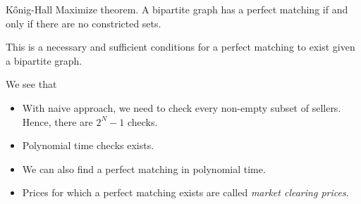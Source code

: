 \begin{theorem}
	Kőnig-Hall Maximize theorem. A bipartite graph has a perfect matching if and only if there are no constricted sets.
\end{theorem}
\begin{note}
	This is a necessary and sufficient conditions for a perfect matching to exist given a bipartite graph.
\end{note}
\begin{remark}
	We see that
	\begin{itemize}
		\item With naive approach, we need to check every non-empty subset of sellers. Hence, there are \(2^N - 1\) checks.
		\item Polynomial time checks exists.
		\item We can also find a perfect matching in polynomial time.
		\item Prices for which a perfect matching exists are called \emph{market clearing prices}.
	\end{itemize}
\end{remark}